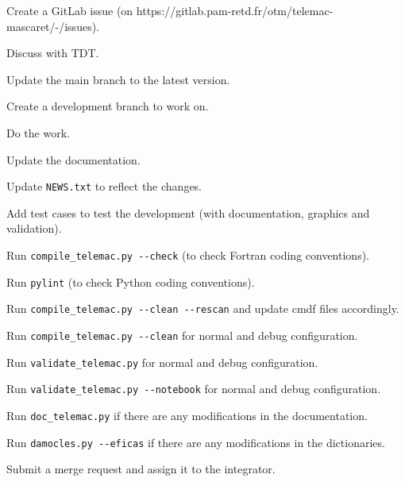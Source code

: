 \begin{todolist}
\setlength\itemsep{0.01em}
\item Create a GitLab issue (on https://gitlab.pam-retd.fr/otm/telemac-mascaret/-/issues).
\item Discuss with TDT\@.
\item Update the main branch to the latest version.
\item Create a development branch to work on.
\item Do the work.
\item Update the documentation.
\item Update \verb!NEWS.txt! to reflect the changes.
\item Add test cases to test the development (with documentation, graphics and
  validation).
\item Run \verb!compile_telemac.py --check! (to check Fortran coding conventions).
\item Run \verb!pylint! (to check Python coding conventions).
\item Run \verb!compile_telemac.py --clean --rescan! and update cmdf files accordingly.
\item Run \verb!compile_telemac.py --clean! for normal and debug configuration.
\item Run \verb!validate_telemac.py! for normal and debug configuration.
\item Run \verb!validate_telemac.py --notebook! for normal and debug configuration.
\item Run \verb!doc_telemac.py! if there are any modifications in the documentation.
\item Run \verb!damocles.py --eficas! if there are any modifications in the
  dictionaries.
\item Submit a merge request and assign it to the integrator.
\end{todolist}
